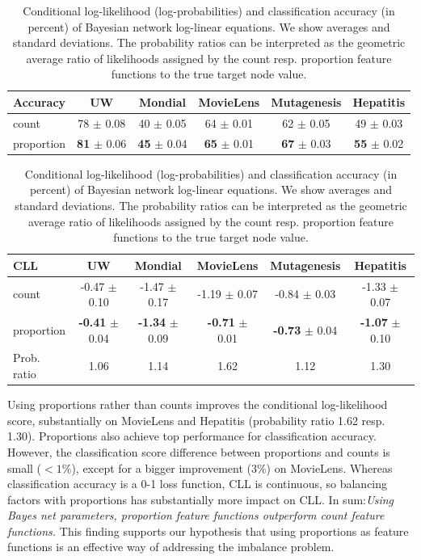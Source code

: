 \documentclass[runningheads,a4paper]{llncs}
\newcommand{\keypoint}[1]{{\em #1}}
\begin{document}
 
\begin{table}[thbp]
\caption{Conditional log-likelihood (log-probabilities) and classification accuracy (in percent) of Bayesian network log-linear equations. We show averages and standard deviations. The probability ratios can be interpreted as the geometric average ratio of likelihoods assigned by the count resp. proportion feature functions to the true target node value.}


\begin{center}
\begin{tabular}{|l|c|c|c|c|c|}
\hline
Accuracy& UW & Mondial & MovieLens & Mutagenesis & Hepatitis \\\hline
 count & 78 $\pm$ 0.08 & 40 $\pm$ 0.05 & 64 $\pm$ 0.01 & 62 $\pm$ 0.05 & 49 $\pm$ 0.03 \\

proportion & \textbf{81} $\pm$ 0.06 & \textbf{45} $\pm$ 0.04 & \textbf{65} $\pm$ 0.01 & \textbf{67} $\pm$ 0.03 & \textbf{55} $\pm$ 0.02 \\
\hline
\end{tabular}
\end{center}

\begin{center}
\begin{tabular}{|l|c|c|c|c|c|}
\hline
CLL & UW & Mondial & MovieLens & Mutagenesis & Hepatitis \\\hline
count & -0.47 $\pm$ 0.10 & -1.47 $\pm$ 0.17 & -1.19 $\pm$ 0.07 & -0.84 $\pm$ 0.03 & -1.33 $\pm$ 0.07 \\
proportion & \textbf{-0.41} $\pm$ 0.04 & \textbf{-1.34} $\pm$ 0.09 & \textbf{-0.71} $\pm$ 0.01 & \textbf{-0.73} $\pm$ 0.04 & \textbf{-1.07} $\pm$ 0.10\\
Prob. ratio & 1.06 & 1.14 & 1.62 & 1.12 & 1.30\\
\hline
\end{tabular}
\end{center}
\label{table:bn}
\end{table}%

Using proportions rather than counts improves the conditional log-likelihood score, substantially on MovieLens and Hepatitis (probability ratio 1.62 resp. 1.30).
Proportions also achieve top performance for  classification accuracy. However, the classification score difference between proportions and counts is small ($<1\%$), except for a bigger improvement (3\%) on MovieLens. Whereas classification accuracy is a 0-1 loss function, CLL is continuous, so balancing factors with proportions has substantially more impact on CLL. In sum:\keypoint{Using Bayes net parameters, proportion feature functions outperform count feature functions.} This finding supports our hypothesis that using proportions as feature functions is an effective way of addressing the imbalance problem.
\end{document}
